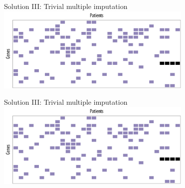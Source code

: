 \documentclass[mathserif]{beamer}
\begin{document}
\begin{frame}{Solution III: Trivial multiple imputation}
  \centering
  \includegraphics[width=3.7in]{figures/example1_missing.pdf}
  
  \vspace{2em}
\end{frame}

\begin{frame}{Solution III: Trivial multiple imputation}
  \centering
  \includegraphics[width=3.7in]{figures/example1_missing.pdf}

  \vspace{2em}
\end{frame}
\end{document}
